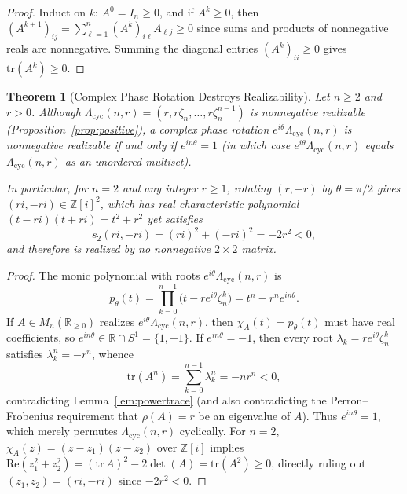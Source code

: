\documentclass[11pt]{article}
\newtheorem{theorem}{Theorem}[section]
\theoremstyle{definition}
\theoremstyle{remark}
\begin{document}
\begin{proof}
Induct on $k$: $A^0 = I_n \ge 0$, and if $A^k \ge 0$, then $(A^{k+1})_{ij} = \sum_{\ell=1}^n
(A^k)_{i\ell} A_{\ell j} \ge 0$ since sums and products of nonnegative reals are
nonnegative. Summing the diagonal entries $(A^k)_{ii} \ge 0$ gives $\mathrm{tr}(A^k) \ge 0$.
\end{proof}

\begin{theorem}[Complex Phase Rotation Destroys Realizability]\label{thm:rotation}
Let $n \ge 2$ and $r > 0$. Although $\Lambda_{\mathrm{cyc}}(n, r) = (r, r\zeta_n, \dots,
r\zeta_n^{n-1})$ is nonnegative realizable (Proposition~\ref{prop:positive}), a complex
phase rotation $e^{i\theta}\Lambda_{\mathrm{cyc}}(n, r)$ is nonnegative realizable if and
only if $e^{in\theta} = 1$ (in which case $e^{i\theta}\Lambda_{\mathrm{cyc}}(n, r)$ equals
$\Lambda_{\mathrm{cyc}}(n, r)$ as an unordered multiset).

In particular, for $n = 2$ and any integer $r \ge 1$, rotating $(r, -r)$ by $\theta =
\pi / 2$ gives $(ri, -ri) \in \mathbb{Z}[i]^2$, which has real characteristic polynomial
$(t - ri)(t + ri) = t^2 + r^2$ yet satisfies
\[
  s_2(ri, -ri) = (ri)^2 + (-ri)^2 = -2r^2 < 0,
\]
and therefore is realized by \emph{no} nonnegative $2 \times 2$ matrix.
\end{theorem}

\begin{proof}
The monic polynomial with roots $e^{i\theta}\Lambda_{\mathrm{cyc}}(n, r)$ is
\[
  p_\theta(t) = \prod_{k=0}^{n-1} \bigl(t - r e^{i\theta}\zeta_n^k\bigr)
  = t^n - r^n e^{in\theta}.
\]
If $A \in M_n(\mathbb{R}_{\ge 0})$ realizes $e^{i\theta}\Lambda_{\mathrm{cyc}}(n, r)$, then
$\chi_A(t) = p_\theta(t)$ must have real coefficients, so $e^{in\theta} \in \mathbb{R} \cap
S^1 = \{1, -1\}$. If $e^{in\theta} = -1$, then every root $\lambda_k = r e^{i\theta}
\zeta_n^k$ satisfies $\lambda_k^n = -r^n$, whence
\[
  \mathrm{tr}(A^n) = \sum_{k=0}^{n-1} \lambda_k^n = -n r^n < 0,
\]
contradicting Lemma~\ref{lem:powertrace} (and also contradicting the Perron--Frobenius
requirement that $\rho(A) = r$ be an eigenvalue of $A$). Thus $e^{in\theta} = 1$, which
merely permutes $\Lambda_{\mathrm{cyc}}(n, r)$ cyclically. For $n = 2$, $\chi_A(z) =
(z - z_1)(z - z_2)$ over $\mathbb{Z}[i]$ implies $\mathrm{Re}(z_1^2 + z_2^2) =
(\mathrm{tr}\,A)^2 - 2\det(A) = \mathrm{tr}(A^2) \ge 0$, directly ruling out
$(z_1, z_2) = (ri, -ri)$ since $-2r^2 < 0$.
\end{proof}
\end{document}
